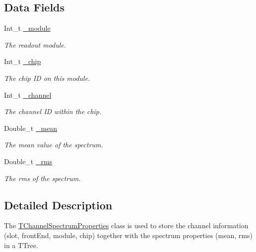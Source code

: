 \subsection*{Data Fields}
\begin{DoxyCompactItemize}
\item 
Int\-\_\-t \hyperlink{class_t_channel_spectrum_properties_ae3cf44950a58087f83b1660648750619}{\-\_\-module}
\begin{DoxyCompactList}\small\item\em The readout module. \end{DoxyCompactList}\item 
Int\-\_\-t \hyperlink{class_t_channel_spectrum_properties_afdfd4c52a9b23cd7cd76dda75b595e27}{\-\_\-chip}
\begin{DoxyCompactList}\small\item\em The chip I\-D on this module. \end{DoxyCompactList}\item 
Int\-\_\-t \hyperlink{class_t_channel_spectrum_properties_a6bfd5e0b63e55aed4d1816a722f5c2e7}{\-\_\-channel}
\begin{DoxyCompactList}\small\item\em The channel I\-D within the chip. \end{DoxyCompactList}\item 
Double\-\_\-t \hyperlink{class_t_channel_spectrum_properties_a480a137b650eda8d36fb633de95259d1}{\-\_\-mean}
\begin{DoxyCompactList}\small\item\em The mean value of the spectrum. \end{DoxyCompactList}\item 
Double\-\_\-t \hyperlink{class_t_channel_spectrum_properties_a1eb2a743128d8069e0e962dfaaff3367}{\-\_\-rms}
\begin{DoxyCompactList}\small\item\em The rms of the spectrum. \end{DoxyCompactList}\end{DoxyCompactItemize}


\subsection{Detailed Description}
The \hyperlink{class_t_channel_spectrum_properties}{T\-Channel\-Spectrum\-Properties} class is used to store the channel information (slot, front\-End, module, chip) together with the spectrum properties (mean, rms) in a T\-Tree. 


